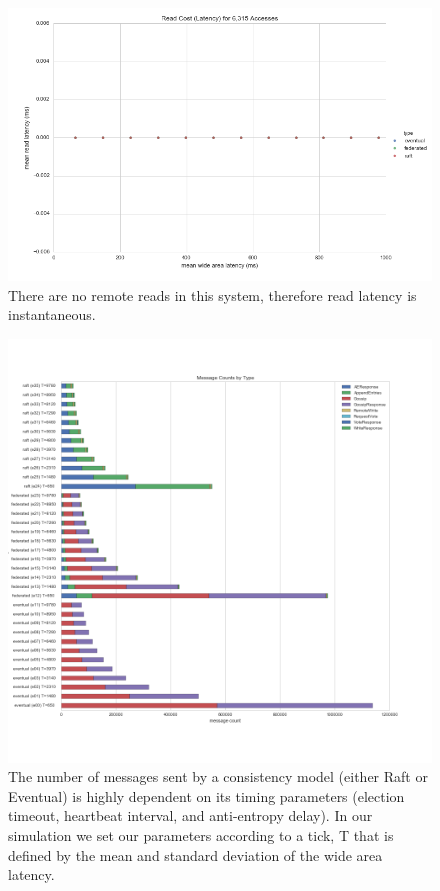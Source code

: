 \documentclass[11pt,letterpaper]{article}
\begin{document}
\begin{figure}[!h]
    \centering
        \includegraphics[width=\textwidth]{figures/read_latency.png}
        \caption{\textsf{There are no remote reads in this system, therefore read latency is instantaneous.}}
        \label{fig:read_latency}
\end{figure}

\begin{figure}[!h]
    \centering
        \includegraphics[width=\textwidth]{figures/message_counts.png}
        \caption{\textsf{The number of messages sent by a consistency model (either Raft or Eventual) is highly dependent on its timing parameters (election timeout, heartbeat interval, and anti-entropy delay). In our simulation we set our parameters according to a tick, T that is defined by the mean and standard deviation of the wide area latency.}}
        \label{fig:message_counts}
\end{figure}
\end{document}
